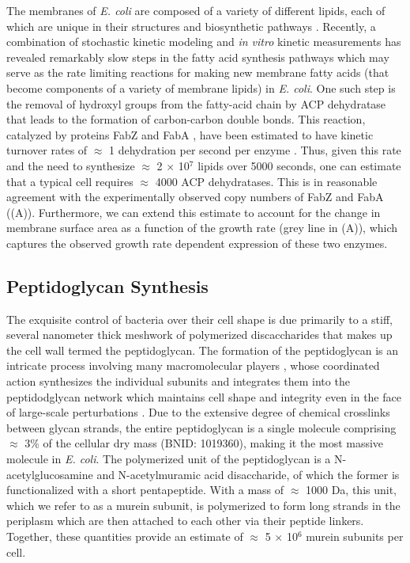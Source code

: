 The membranes of \textit{E. coli} are composed of a variety of different lipids,
each of which are unique in their structures and biosynthetic pathways
\citep{sohlenkamp2016}. Recently, a combination of stochastic kinetic modeling
\citep{ruppe2018} and \textit{in vitro} kinetic measurements
\citep{ranganathan2012, yu2011} has revealed remarkably slow steps in the fatty
acid synthesis pathways which may serve as the rate limiting reactions for
making new membrane fatty acids (that become components of a variety of 
membrane lipids) in \textit{E. coli}. One such step is the removal of hydroxyl
groups from the fatty-acid chain by ACP dehydratase that leads to the formation
of carbon-carbon double bonds. This reaction, catalyzed by proteins FabZ and
FabA \citep{yu2011}, have been estimated to have kinetic
turnover rates of $\approx$ 1 dehydration per second per enzyme
\citep{ruppe2018}. Thus, given this rate and the need to synthesize $\approx$ 2
$\times$ 10$^7$ lipids over 5000 seconds, one can estimate that a typical cell
requires $\approx$ 4000 ACP dehydratases. This is in reasonable agreement with
the experimentally observed copy numbers of FabZ and FabA
((A)). Furthermore, we can extend this estimate to account
for the change in membrane surface area as a function of the growth rate (grey
line in (A)), which captures the observed growth rate
dependent expression of these two enzymes.

\subsection{Peptidoglycan Synthesis}
The exquisite control of bacteria over their cell shape is due primarily to a stiff, several nanometer thick meshwork of
polymerized discaccharides that makes up the cell wall termed the peptidoglycan. The formation of the peptidoglycan is an intricate
process involving many macromolecular players \citep{shi2018, morgenstein2015},
whose coordinated action synthesizes the individual subunits and integrates them 
into the peptidodglycan network which maintains cell shape and integrity even in the face of
large-scale perturbations \citep{harris2018,shi2018}.
Due to the extensive degree of chemical crosslinks between glycan strands, the 
entire peptidoglycan is a single molecule comprising $\approx$ 3\% of the cellular dry mass (BNID:
1019360), making it the most massive molecule in \textit{E. coli}. The
polymerized unit of the peptidoglycan is a N-acetylglucosamine and
N-acetylmuramic acid disaccharide, of which the former is functionalized with a
short pentapeptide. With a mass of $\approx$ 1000 Da, this unit, which we refer
to as a murein subunit, is polymerized to form long strands in the periplasm
which are then attached to each other via their peptide linkers. Together, these
quantities provide an estimate of $\approx$ 5 $\times$ 10$^6$ murein subunits
per cell.

